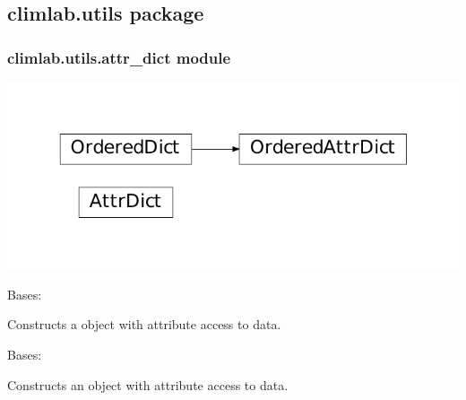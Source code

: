 \documentclass[a4paper,10pt,english]{sphinxmanual}
\begin{document}
\subsection{climlab.utils package}
\label{api/climlab.utils::doc}\label{api/climlab.utils:climlab-utils-package}

\subsubsection{climlab.utils.attr\_dict module}
\label{api/climlab.utils:climlab-utils-attr-dict-module}
\includegraphics{inheritance-bef65cee25121f0f467c31bf205dd368e8cec68f.pdf}
\label{api/climlab.utils:module-climlab.utils.attr_dict}

\begin{fulllineitems}
\label{api/climlab.utils:climlab.utils.attr_dict.AttrDict}
Bases: \href{http://docs.python.org/2.7/library/stdtypes.html\#dict}{}

Constructs a \href{http://docs.python.org/2.7/library/stdtypes.html\#dict}{} object with attribute access to data.

\end{fulllineitems}


\begin{fulllineitems}
\label{api/climlab.utils:climlab.utils.attr_dict.OrderedAttrDict}
Bases: \href{http://docs.python.org/2.7/library/collections.html\#collections.OrderedDict}{}

Constructs an \href{http://docs.python.org/2.7/library/collections.html\#collections.OrderedDict}{} object with attribute access to data.

\end{fulllineitems}
\end{document}
